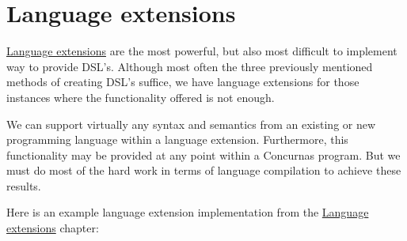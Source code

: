 \documentclass[conc-doc]{subfiles}
\begin{document}
\section{Language extensions}
\hyperref[ch:langExt]{Language extensions} are the most powerful, but also most difficult to implement way to provide DSL's. Although most often the three previously mentioned methods of creating DSL's suffice, we have language extensions for those instances where the functionality offered is not enough.

We can support virtually any syntax and semantics from an existing or new programming language within a language extension. Furthermore, this functionality may be provided at any point within a Concurnas program. But we must do most of the hard work in terms of language compilation to achieve these results.

Here is an example language extension implementation from the \hyperref[ch:langExt]{Language extensions} chapter:
\end{document}
